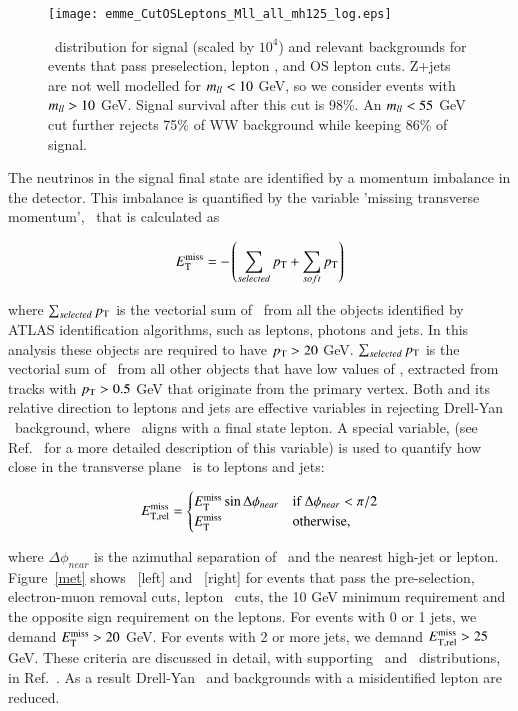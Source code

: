 \begin{figure}[!h]
\centering
	\texttt{[image: emme\_CutOSLeptons\_Mll\_all\_mh125\_log.eps]}\\
\caption{\mll\ distribution for signal (scaled by $10^4$) and relevant backgrounds for 
events that pass preselection, lepton \pt, and OS lepton cuts. Z+jets are not well modelled 
for $m_{ll}<10$ GeV, so we consider events with $m_{ll}>10$ GeV. Signal survival after this cut 
is 98\%. An $m_{ll}<55$ GeV cut further rejects 75\% of WW background while keeping 86\% of signal.}
\label{fig:mllOSleptons}
\end{figure}

\par The neutrinos in the signal final state are identified by a momentum imbalance in the detector.
This imbalance is quantified by the variable 'missing transverse momentum',
\met\ that is calculated as 

\begin{equation}
E_{\mathrm{T}}^{\mathrm{miss}} = - \left (\sum_{selected}p_{\mathrm{T}} + \sum_{soft}p_{\mathrm{T}} \right )
\end{equation}   

where $\sum_{selected}p_{\mathrm{T}}$ is the vectorial sum of \pt\ from 
all the objects identified by ATLAS identification 
algorithms, such as leptons, photons and jets. In this analysis these 
objects are required to have $p_{\mathrm{T}}>20$ GeV. $\sum_{selected}p_{\mathrm{T}}$ is the vectorial sum 
of \pt\ from all other objects that have low values of \pt, extracted 
from tracks with $p_{\mathrm{T}}>0.5$ GeV that originate from the primary vertex. 
Both \met and its relative direction to leptons and jets are effective variables 
in rejecting Drell-Yan \tautau\ background, where \met\ 
aligns with a final state lepton. A special variable, \metRel (see Ref.~\cite{ATLASCONF2014060} for 
a more detailed description of this variable) is used to quantify how close in the transverse 
plane \met\ is to leptons and jets:

\begin{equation}
\metRel = \begin{cases}
				 \met\sin\Delta\phi_{near} & \text{if $\Delta\phi_{near}<\pi/2$} \\
				 \met & \text{otherwise,}
					\end{cases}
\end{equation}  

where $\Delta\phi_{near}$ is the azimuthal separation of \met\ and the nearest 
high-\pt jet or lepton. Figure~\ref{met} shows \met\ [left] and \metRel\ [right] for events that pass the 
pre-selection, electron-muon removal cuts, lepton \pt\ cuts, the 10 GeV \mll minimum requirement and the opposite sign requirement
on the leptons. For events with 0 or 1 jets, we demand $E_{\mathrm{T}}^{\mathrm{miss}}>20$ GeV. For events with 
2 or more jets, we demand  $E_{\mathrm{T,rel}}^{\mathrm{miss}}>25$ GeV. These criteria are discussed in detail, with 
supporting \met\ and \metRel\ distributions, in Ref.~\cite{ATLASCONF2014060}. As a result Drell-Yan \tautau\ 
and backgrounds with a misidentified lepton are reduced. 

